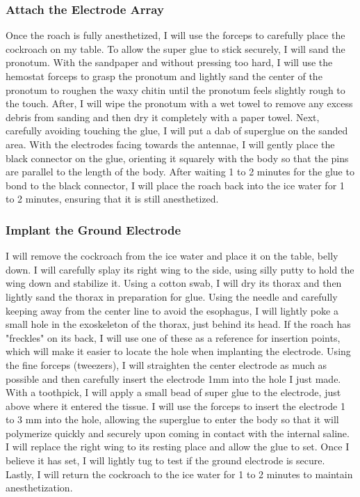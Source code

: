\subsubsection{Attach the Electrode Array}
Once the roach is fully anesthetized, I will use the forceps to carefully place the cockroach on my table. To allow the super glue to stick securely, I will sand the pronotum. With the sandpaper and without pressing too hard, I will use the hemostat forceps to grasp the pronotum and lightly sand the center of the pronotum to roughen the waxy chitin until the pronotum feels slightly rough to the touch. After, I will wipe the pronotum with a wet towel to remove any excess debris from sanding and then dry it completely with a paper towel. Next, carefully avoiding touching the glue, I will put a dab of superglue on the sanded area. With the electrodes facing towards the antennae, I will gently place the black connector on the glue, orienting it squarely with the body so that the pins are parallel to the length of the body. After waiting 1 to 2 minutes for the glue to bond to the black connector, I will place the roach back into the ice water for 1 to 2 minutes, ensuring that it is still anesthetized.


\subsubsection{Implant the Ground Electrode}
I will remove the cockroach from the ice water and place it on the table, belly down. I will carefully splay its right wing to the side, using silly putty to hold the wing down and stabilize it. Using a cotton swab, I will dry its thorax and then lightly sand the thorax in preparation for glue. Using the needle and carefully keeping away from the center line to avoid the esophagus, I will lightly poke a small hole in the exoskeleton of the thorax, just behind its head. If the roach has "freckles" on its back, I will use one of these as a reference for insertion points, which will make it easier to locate the hole when implanting the electrode. Using the fine forceps (tweezers), I will straighten the center electrode as much as possible and then carefully insert the electrode 1mm into the hole I just made. With a toothpick, I will apply a small bead of super glue to the electrode, just above where it entered the tissue. I will use the forceps to insert the electrode 1 to 3 mm into the hole, allowing the superglue to enter the body so that it will polymerize quickly and securely upon coming in contact with the internal saline. I will replace the right wing to its resting place and allow the glue to set. Once I believe it has set, I will lightly tug to test if the ground electrode is secure. Lastly, I will return the cockroach to the ice water for 1 to 2 minutes to maintain anesthetization.


